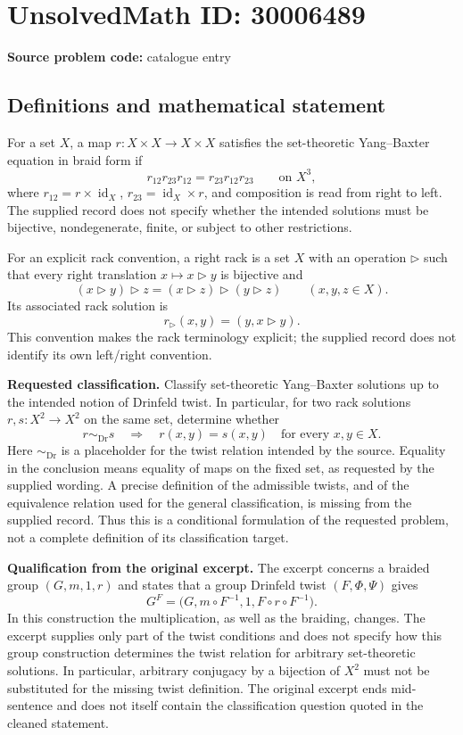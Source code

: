 \documentclass[11pt]{article}
\begin{document}
\section*{UnsolvedMath ID: 30006489}
\textbf{Source problem code:} catalogue entry
\subsection{Definitions and mathematical statement}
For a set \(X\), a map \(r\colon X\times X\to X\times X\) satisfies the set-theoretic Yang--Baxter equation in braid form if
\[
 r_{12}r_{23}r_{12}=r_{23}r_{12}r_{23}\qquad\text{on }X^3,
\]
where \(r_{12}=r\times\operatorname{id}_X\), \(r_{23}=\operatorname{id}_X\times r\), and composition is read from right to left. The supplied record does not specify whether the intended solutions must be bijective, nondegenerate, finite, or subject to other restrictions.

For an explicit rack convention, a right rack is a set \(X\) with an operation \(\triangleright\) such that every right translation \(x\mapsto x\triangleright y\) is bijective and
\[
 (x\triangleright y)\triangleright z
 = (x\triangleright z)\triangleright(y\triangleright z)
 \qquad(x,y,z\in X).
\]
Its associated rack solution is
\[
 r_{\triangleright}(x,y)=(y,x\triangleright y).
\]
This convention makes the rack terminology explicit; the supplied record does not identify its own left/right convention.

\textbf{Requested classification.} Classify set-theoretic Yang--Baxter solutions up to the intended notion of Drinfeld twist. In particular, for two rack solutions \(r,s\colon X^2\to X^2\) on the same set, determine whether
\[
 r\sim_{\mathrm{Dr}}s\quad\Longrightarrow\quad
 r(x,y)=s(x,y)\quad\text{for every }x,y\in X.
\]
Here \(\sim_{\mathrm{Dr}}\) is a placeholder for the twist relation intended by the source. Equality in the conclusion means equality of maps on the fixed set, as requested by the supplied wording. A precise definition of the admissible twists, and of the equivalence relation used for the general classification, is missing from the supplied record. Thus this is a conditional formulation of the requested problem, not a complete definition of its classification target.

\textbf{Qualification from the original excerpt.} The excerpt concerns a braided group \((G,m,1,r)\) and states that a group Drinfeld twist \((F,\Phi,\Psi)\) gives
\[
 G^F=\bigl(G,m\circ F^{-1},1,F\circ r\circ F^{-1}\bigr).
\]
In this construction the multiplication, as well as the braiding, changes. The excerpt supplies only part of the twist conditions and does not specify how this group construction determines the twist relation for arbitrary set-theoretic solutions. In particular, arbitrary conjugacy by a bijection of \(X^2\) must not be substituted for the missing twist definition. The original excerpt ends mid-sentence and does not itself contain the classification question quoted in the cleaned statement.
\end{document}
